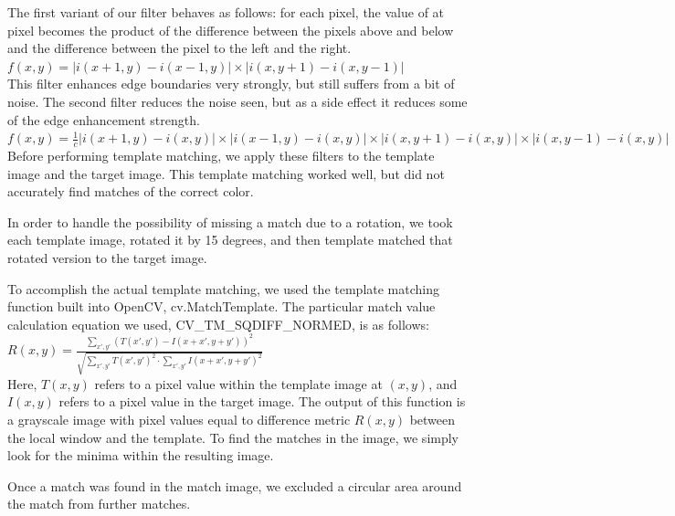 \documentclass[conference]{IEEEtran}
\begin{document}
The first variant of our filter behaves as follows: for each pixel, the value of at pixel becomes the product of the difference between the pixels above and below and the difference between the pixel to the left and the right.
\\[6pt]
\begin{math} 
	f(x,y) = |i(x+1,y) - i(x-1,y)|  \times |i(x,y+1) - i(x,y-1)| 
\end{math} 
\\[6pt]
This filter enhances edge boundaries very strongly, but still suffers from a bit of noise. The second filter reduces the noise seen, but as a side effect it reduces some of the edge enhancement strength. 
\\[6pt]
\begin{math} 
	f(x,y) = \frac{1}{c} |i(x+1,y) - i(x,y)|  \times |i(x-1,y) - i(x,y)| \times |i(x,y+1) - i(x,y)| \times |i(x,y-1) - i(x,y)| 
\end{math} 
\\[6pt]

Before performing template matching, we apply these filters to the template image and the target image. This template matching worked well, but did not accurately find matches of the correct color.

In order to handle the possibility of missing a match due to a rotation, we took each template image, rotated it by 15 degrees, and then template matched that rotated version to the target image.

To accomplish the actual template matching, we used the template matching function built into OpenCV, cv.MatchTemplate. The particular match value calculation equation we used, CV\_TM\_SQDIFF\_NORMED,  is as follows: 
\\[6pt]
\begin{math} 
	R(x,y) = \frac{\sum_{x',y'}(T(x',y')-I(x+x',y+y'))^{2}}{\sqrt{\sum_{x',y'}T(x',y')^{2}\cdot \sum_{x',y'}I(x+x',y+y')^{2} }}
\end{math} 
\\[6pt]
Here, $T(x,y)$ refers to a pixel value within the template image at $(x,y)$, and $I(x,y)$ refers to a pixel value in the target image. The output of this function is a grayscale image with pixel values equal to difference metric $R(x,y)$ between the local window and the template.  To find the matches in the image, we simply look for the minima within the resulting image.

Once a match was found in the match image, we excluded a circular area around the match from further matches.
\end{document}
